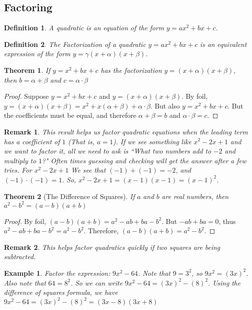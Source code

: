 \documentclass{article}
\theoremstyle{mystyle}
\newtheorem{theorem}{Theorem}[section]
\newtheorem{definition}{Definition}[section]
\newtheorem{example}{Example}[section]
\newtheorem{remark}{Remark}[section]
\begin{document}
\subsection{Factoring}
\begin{definition}
A quadratic is an equation of the form $y=ax^2+bx+c$.
\end{definition}
\begin{definition}
The Factorization of a quadratic $y=ax^2+bx+c$ is an equivalent expression of the form $y=\gamma(x+\alpha)(x+\beta)$.
\end{definition}
\begin{theorem}
\label{theorem:north_shore_factorization_of_quadratic_when_a_is_equal_to_zero}
If $y=x^2+bx+c$ has the factorization $y=(x+\alpha)(x+\beta)$, then $b=\alpha+\beta$ and $c=\alpha\cdot\beta$
\end{theorem}
\begin{proof}
Suppose $y = x^2 + bx + c$ and $y = (x+\alpha)(x+\beta)$. By \gls{foil}, $y = (x+\alpha)(x+\beta) = x^2 +x(\alpha + \beta) + \alpha \cdot \beta$. But also $y=x^2 + bx + c$. But the coefficients must be equal, and therefore $\alpha + \beta = b$ and $\alpha \cdot \beta = c$.
\end{proof}
\begin{remark}\label{remark:north_shore_example_of_using_factorization_when_a_equals_zero}
This result helps us factor quadratic equations when the leading term has a coefficient of $1$ (That is, $a=1$). If we see something like $x^2-2x + 1$ and we want to factor it, all we need to ask is ``What two numbers add to $-2$ and multiply to $1$?" Often times guessing and checking will get the answer after a few tries. For $x^2-2x+1$ We see that $(-1)+(-1) = -2$, and $(-1)\cdot (-1) = 1$. So, $x^2 - 2x +1 = (x-1)(x-1) = (x-1)^2$.
\end{remark}
\begin{theorem}[The Difference of Squares]
\label{theorem:north_shore_difference_of_squares}
If $a$ and $b$ are real numbers, then $a^{2}-b^{2}=(a-b)(a+b)$
\end{theorem}
\begin{proof}
By \gls{foil}, $(a-b)(a+b) = a^2 - ab + ba - b^2$. But $-ab+ba = 0$, thus $a^2 - ab + ba - b^2 = a^2 - b^2$. Therefore, $(a-b)(a+b) = a^2-b^2$.
\end{proof}
\begin{remark}
This helps factor quadratics quickly if two squares are being subtracted.
\end{remark}
\begin{example}
Factor the expression: $9x^2 - 64$. Note that $9 = 3^2$, so $9x^2 = (3x)^2$. Also note that $64 = 8^2$. So we can write $9x^2 - 64 = (3x)^2 - (8)^2$. Using the difference of squares formula, we have $9x^2 - 64 = (3x)^2 - (8)^2 = (3x-8)(3x+8)$
\end{example}
\end{document}
